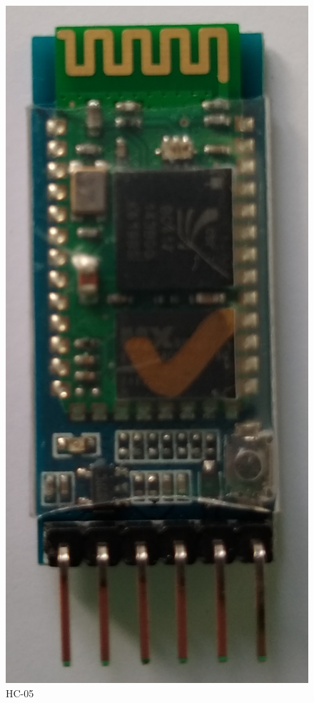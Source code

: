 \documentclass[12pt,a4paper]{article}
\begin{document}
		\begin{figure}
			\centering
			\includegraphics[scale=0.06]{hc-05_1.jpg}
			\caption[HC-05 Bluetooth module]{HC-05}
		\end{figure}
\end{document}
